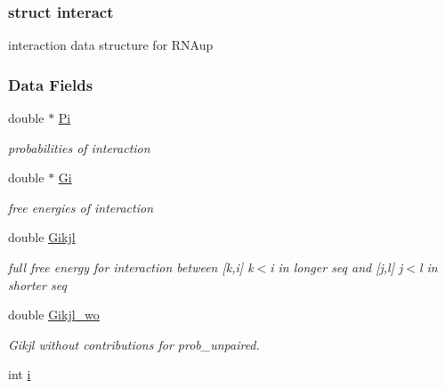 \subsubsection{struct interact}
interaction data structure for R\+N\+Aup \subsubsection*{Data Fields}
\begin{DoxyCompactItemize}
\item 
double $\ast$ \hyperlink{group__data__structures_a1fc8b3860c083f164daa9712690a3a56}{Pi}\hypertarget{group__data__structures_a1fc8b3860c083f164daa9712690a3a56}{}\label{group__data__structures_a1fc8b3860c083f164daa9712690a3a56}

\begin{DoxyCompactList}\small\item\em probabilities of interaction \end{DoxyCompactList}\item 
double $\ast$ \hyperlink{group__data__structures_a54f8183542fff4c32ab7ace49a16c02c}{Gi}\hypertarget{group__data__structures_a54f8183542fff4c32ab7ace49a16c02c}{}\label{group__data__structures_a54f8183542fff4c32ab7ace49a16c02c}

\begin{DoxyCompactList}\small\item\em free energies of interaction \end{DoxyCompactList}\item 
double \hyperlink{group__data__structures_ad58303190f9e085c3ab59890cbf61223}{Gikjl}\hypertarget{group__data__structures_ad58303190f9e085c3ab59890cbf61223}{}\label{group__data__structures_ad58303190f9e085c3ab59890cbf61223}

\begin{DoxyCompactList}\small\item\em full free energy for interaction between \mbox{[}k,i\mbox{]} k$<$i in longer seq and \mbox{[}j,l\mbox{]} j$<$l in shorter seq \end{DoxyCompactList}\item 
double \hyperlink{group__data__structures_a41793812abae560805414761fec398fe}{Gikjl\+\_\+wo}\hypertarget{group__data__structures_a41793812abae560805414761fec398fe}{}\label{group__data__structures_a41793812abae560805414761fec398fe}

\begin{DoxyCompactList}\small\item\em Gikjl without contributions for prob\+\_\+unpaired. \end{DoxyCompactList}\item 
int \hyperlink{group__data__structures_ab6d031a21388be8763b75ea74c937f17}{i}\hypertarget{group__data__structures_ab6d031a21388be8763b75ea74c937f17}{}\label{group__data__structures_ab6d031a21388be8763b75ea74c937f17}


\end{DoxyCompactItemize}
